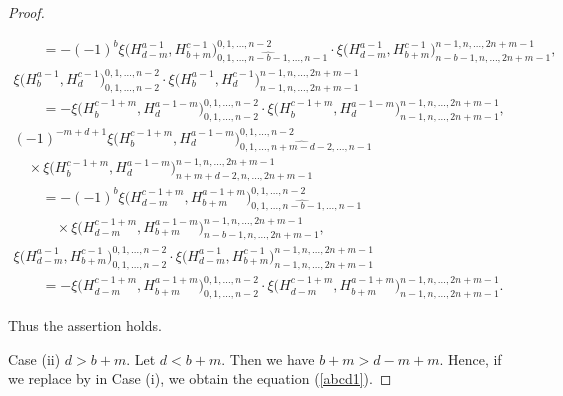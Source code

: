 \documentclass[10pt,a4paper]{amsart}
\numberwithin{equation}{section}
\begin{document}
\begin{proof}
\begin{itemize}
\begin{gather*}
\qquad{}=-{(-1)}^{b}\xi\bigl(H^{a-1}_{d-m}, H^{c-1}_{b+m}\bigr)^{0,1,\dots,n-2}_{0,1,\dots,\widehat{n-b-1},\dots,n-1}\cdot \xi\bigl(H^{a-1}_{d-m}, H^{c-1}_{b+m}\bigr)^{n-1,n,\dots,2n+m-1}_{n-b-1,n,\dots,2n+m-1},\\
\xi\bigl(H^{a-1}_{b}, H^{c-1}_{d}\bigr)^{0,1,\dots,n-2}_{0,1,\dots,n-2}\cdot\xi\bigl(H^{a-1}_{b}, H^{c-1}_{d}\bigr)^{n-1,n,\dots,2n+m-1}_{n-1,n,\dots,2n+m-1}\\
\qquad{}=-\xi\bigl(H^{c-1+m}_{b}, H^{a-1-m}_{d}\bigr)^{0,1,\dots,n-2}_{0,1,\dots,n-2}\cdot\xi\bigl(H^{c-1+m}_{b}, H^{a-1-m}_{d}\bigr)^{n-1,n,\dots,2n+m-1}_{n-1,n,\dots,2n+m-1},\\
{(-1)}^{-m+d+1}\xi\bigl(H^{c-1+m}_{b}, H^{a-1-m}_{d}\bigr)^{0,1,\dots,n-2}_{0,1,\dots,\widehat{n+m-d-2},\dots,n-1}\\
\quad{}\times \xi\bigl(H^{c-1+m}_{b}, H^{a-1-m}_{d}\bigr)^{n-1,n,\dots,2n+m-1}_{n+m+d-2,n,\dots,2n+m-1}\\
\qquad{}=-{(-1)}^{b}\xi\bigl(H^{c-1+m}_{d-m}, H^{a-1+m}_{b+m}\bigr)^{0,1,\dots,n-2}_{0,1,\dots,\widehat{n-b-1},\dots,n-1}\\
\qquad\quad{}\times \xi\bigl(H^{c-1+m}_{d-m}, H^{a-1-m}_{b+m}\bigr)^{n-1,n,\dots,2n+m-1}_{n-b-1,n,\dots,2n+m-1},\\
\xi\bigl(H^{a-1}_{d-m}, H^{c-1}_{b+m}\bigr)^{0,1,\dots,n-2}_{0,1,\dots,n-2}\cdot\xi\bigl(H^{a-1}_{d-m}, H^{c-1}_{b+m}\bigr)^{n-1,n,\dots,2n+m-1}_{n-1,n,\dots,2n+m-1}\\
\qquad{}=-\xi\bigl(H^{c-1+m}_{d-m}, H^{a-1+m}_{b+m}\bigr)^{0,1,\dots,n-2}_{0,1,\dots,n-2}\cdot\xi\bigl(H^{c-1+m}_{d-m}, H^{a-1+m}_{b+m}\bigr)^{n-1,n,\dots,2n+m-1}_{n-1,n,\dots,2n+m-1}.
\end{gather*}
\end{itemize}
Thus the assertion holds.

Case (ii) $d>b+m$.
Let $d<b+m$. Then we have $b+m>d-m+m$. Hence, if we replace  by  in Case (i), we obtain the equation (\ref{abcd1}).


\end{proof}
\end{document}
